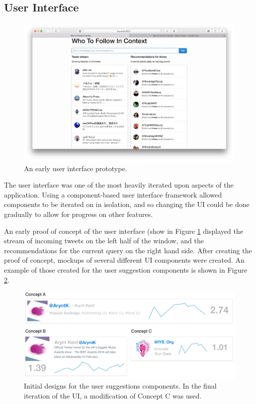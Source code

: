 \documentclass{l4proj}
\begin{document}
        \subsection{User Interface}
\begin{figure}
\centering
\includegraphics[scale=0.24]{initialui.png}
\caption{An early user interface prototype.}
\label{initialui}
\end{figure} 
        
        The user interface was one of the most heavily iterated upon aspects of the application. Using a component-based user interface framework allowed components to be iterated on in isolation, and so changing the UI could be done gradually to allow for progress on other features.
        
        An early proof of concept of the user interface (show in Figure \ref{initialui} displayed the stream of incoming tweets on the left half of the window, and the recommendations for the current query on the right hand side. After creating the proof of concept, mockups of several different UI components were created. An example of those created for the user suggestion components is shown in Figure \ref{suggestionsmockups}.
        
\begin{figure}[H]
\centering
\includegraphics[scale=0.5]{suggestionsmockups.pdf}
\caption{Initial designs for the user suggestions components. In the final iteration of the UI, a modification of Concept C was used.}
\label{suggestionsmockups}
\end{figure}
        
\end{document}
